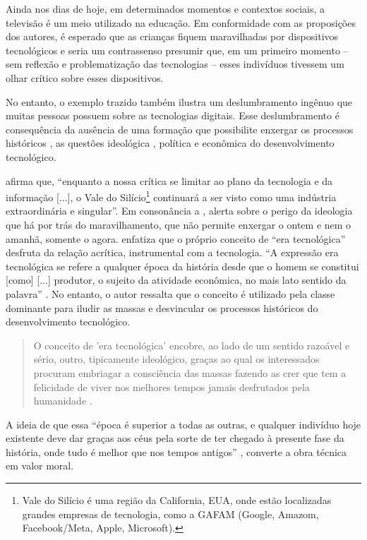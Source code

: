 \documentclass[portuguese]{textolivre}
\begin{document}
Ainda nos dias de hoje, em determinados momentos e contextos sociais, a televisão é um meio utilizado na educação. Em conformidade com as proposições dos autores, é esperado que as crianças fiquem maravilhadas por dispositivos tecnológicos e seria um contrassenso presumir que, em um primeiro momento – sem reflexão e problematização das tecnologias – esses indivíduos tivessem um olhar crítico sobre esses dispositivos.

No entanto, o exemplo trazido também ilustra um deslumbramento ingênuo que muitas pessoas possuem sobre as tecnologias digitais. Esse deslumbramento é consequência da ausência de uma formação que possibilite enxergar os processos históricos \cite{pinto_o_2005}, as questões ideológica \cite{pinto_o_2005, freire_educar_2011}, política e econômica \cite{freire_educar_2011, morozov2018} do desenvolvimento tecnológico.

\textcite[p. 22]{morozov2018} afirma que, “enquanto a nossa crítica se limitar ao plano da tecnologia e da informação [...], o Vale do Silício\footnote{Vale do Silício é uma região da California, EUA, onde estão localizadas grandes empresas de tecnologia, como a GAFAM (Google, Amazom, Facebook/Meta, Apple, Microsoft).} continuará a ser visto como uma indústria extraordinária e singular”. Em consonância a \textcite{morozov2018}, \textcite{pinto_o_2005} alerta sobre o perigo da ideologia que há por trás do maravilhamento, que não permite enxergar o ontem e nem o amanhã, somente o agora. \textcite{pinto_o_2005} enfatiza que o próprio conceito de “era tecnológica” desfruta da relação acrítica, instrumental com a tecnologia. “A expressão era tecnológica se refere a qualquer época da história desde que o homem se constitui [como] [...] produtor, o sujeito da atividade econômica, no mais lato sentido da palavra” \cite[p.63]{pinto_o_2005}. No entanto, o autor ressalta que o conceito é utilizado pela classe dominante para iludir as massas e desvincular os processos históricos do desenvolvimento tecnológico.

\begin{quote}
 O conceito de ’era tecnológica’ encobre, ao lado de um sentido razoável e sério, outro, tipicamente ideológico, graças ao qual os interessados procuram embriagar a consciência das massas fazendo as crer que tem a felicidade de viver nos melhores tempos jamais desfrutados pela humanidade \cite[p. 41]{pinto_o_2005}.
\end{quote}

A ideia de que essa “época é superior a todas as outras, e qualquer indivíduo hoje existente deve dar graças aos céus pela sorte de ter chegado à presente fase da história, onde tudo é melhor que nos tempos antigos” \cite[p. 41]{pinto_o_2005}, converte a obra técnica em valor moral.
\end{document}

